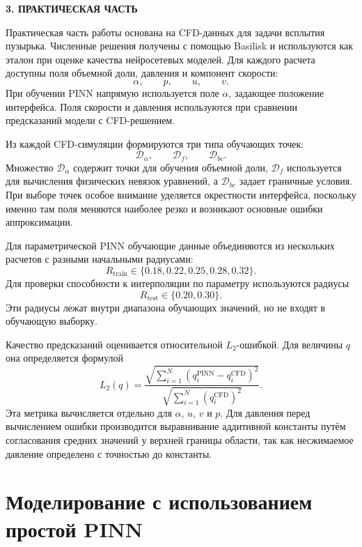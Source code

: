 \newpage
\begin{center}
  \textbf{\large 3. ПРАКТИЧЕСКАЯ ЧАСТЬ}
\end{center}

Практическая часть работы основана на CFD-данных для задачи всплытия пузырька.
Численные решения получены с помощью Basilisk и используются как эталон при
оценке качества нейросетевых моделей. Для каждого расчета доступны поля
объемной доли, давления и компонент скорости:
\[
    \alpha,\qquad p,\qquad u,\qquad v.
\]
При обучении PINN напрямую используется поле \(\alpha\), задающее положение
интерфейса. Поля скорости и давления используются при сравнении предсказаний
модели с CFD-решением.

Из каждой CFD-симуляции формируются три типа обучающих точек:
\[
    \mathcal{D}_\alpha,\qquad
    \mathcal{D}_f,\qquad
    \mathcal{D}_{bc}.
\]
Множество \(\mathcal{D}_\alpha\) содержит точки для обучения объемной доли,
\(\mathcal{D}_f\) используется для вычисления физических невязок уравнений, а
\(\mathcal{D}_{bc}\) задает граничные условия. При выборе точек особое внимание
уделяется окрестности интерфейса, поскольку именно там поля меняются наиболее
резко и возникают основные ошибки аппроксимации.

Для параметрической PINN обучающие данные объединяются из нескольких расчетов с
разными начальными радиусами:
\[
    R_{\mathrm{train}}\in\{0.18,0.22,0.25,0.28,0.32\}.
\]
Для проверки способности к интерполяции по параметру используются радиусы
\[
    R_{\mathrm{test}}\in\{0.20,0.30\}.
\]
Эти радиусы лежат внутри диапазона обучающих значений, но не входят в обучающую
выборку.

Качество предсказаний оценивается относительной \(L_2\)-ошибкой. Для величины
\(q\) она определяется формулой
\begin{equation}
    L_2(q)
    =
    \frac{\sqrt{\sum_{i=1}^{N}(q_i^{\mathrm{PINN}}-q_i^{\mathrm{CFD}})^2}}
         {\sqrt{\sum_{i=1}^{N}(q_i^{\mathrm{CFD}})^2}}.
    \label{eq:chapter3_l2}
\end{equation}
Эта метрика вычисляется отдельно для \(\alpha\), \(u\), \(v\) и \(p\). Для
давления перед вычислением ошибки производится выравнивание аддитивной
константы путём согласования средних значений у верхней границы области, так
как несжимаемое давление определено с точностью до константы.

\section{Моделирование с использованием простой PINN}

